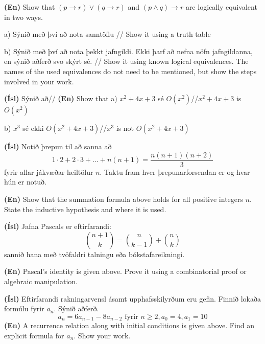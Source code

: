 \documentclass[addpoints]{exam}
\begin{document}
\begin{questions}
\textbf{(En)} Show that $(p \to r) \lor (q \to r)$ and $(p \land q) \to r$ are logically equivalent in two ways.

a) Sýnið með því að nota sanntöflu // Show it using a truth table


\newpage

b) Sýnið með því að nota þekkt jafngildi. Ekki þarf að nefna nöfn jafngildanna, en sýnið aðferð svo skýrt sé. // Show it using known logical equivalences. The names of the used equivalences do not need to be mentioned, but show the steps involved in your work.


\newpage
\question[10]

\textbf{(Ísl)} Sýnið að// \textbf{(En)} Show that
a) $x^2 + 4x + 3$ sé $O(x^2)$//$x^2 + 4x + 3$ is $O(x^2)$


\newpage

b) $x^3$ sé ekki $O(x^2 + 4x + 3)$//$x^3$ is not $O(x^2 + 4x + 3)$


\newpage

\question[10] 

\textbf{(Ísl)} Notið þrepun til að sanna að \[1\cdot 2 + 2 \cdot 3 + \ldots + n(n+1) = \frac{n(n+1)(n+2)}{3}\] fyrir allar jákvæðar heiltölur $n$. Taktu fram hver þrepunarforsendan er og hvar hún er notuð.

\textbf{(En)} Show that the summation formula above holds for all positive integers $n$. State the inductive hypothesis and where it is used.


\newpage

\question[10] 

\textbf{(Ísl)} Jafna Pascals er eftirfarandi:
\[
    \binom{n+1}{k} = \binom{n}{k-1} + \binom{n}{k}
\]
sannið hana með tvöfaldri talningu eða bókstafareikningi.

\textbf{(En)} Pascal's identity is given above. Prove it using a combinatorial proof or algebraic manipulation.


\newpage
\question[10] 

\textbf{(Ísl)} Eftirfarandi rakningarvensl ásamt upphafsskilyrðum eru gefin. Finnið lokaða formúlu fyrir $a_n$. Sýnið aðferð.
\[
    a_n = 6a_{n-1} - 8a_{n-2} \text{ fyrir } n\geq2, a_0 =4, a_1 = 10
\]
\textbf{(En)} A recurrence relation along with initial conditions is given above. Find an explicit formula for $a_n$. Show your work.


\end{questions}
\end{document}
